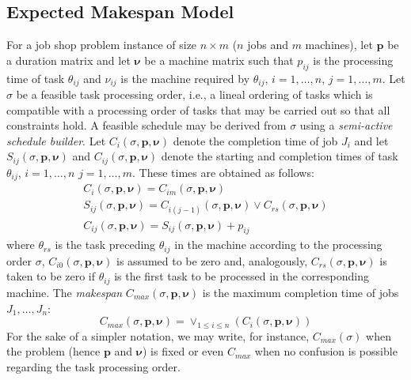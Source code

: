 \documentclass[letterpaper]{article}
\begin{document}
\subsection{Expected Makespan Model}\label{subsecExpectedMakespanProblem}
For a job shop problem instance of size $n \times m$ ($n$ jobs and $m$ machines), let $\boldsymbol{p}$ be a duration matrix and let $\boldsymbol{\nu}$ be a machine matrix such that $p_{ij}$ is the processing time of task $\theta_{ij}$ and $\nu_{ij}$ is the machine required by $\theta_{ij}$, $i=1,\dots,n$, $j=1,\dots,m$. Let $\sigma$ be a feasible task processing order, i.e., a lineal ordering of tasks which is compatible with a processing order of tasks that may be carried out so that all constraints hold. A feasible schedule may be derived from $\sigma$ using a \emph{semi-active schedule builder}. Let $C_i(\sigma,\boldsymbol{p},\boldsymbol{\nu})$ denote the completion time of job $J_i$ and let $S_{ij}(\sigma,\boldsymbol{p},\boldsymbol{\nu})$ and $C_{ij}(\sigma,\boldsymbol{p},\boldsymbol{\nu})$ denote the starting and completion times of task $\theta_{ij}$, $i=1,\dots,n$ $j=1,\dots,m$. These times are obtained as follows:
\begin{gather}
C_i(\sigma,\boldsymbol{p},\boldsymbol{\nu}) = C_{im}(\sigma,\boldsymbol{p},\boldsymbol{\nu})\\
S_{ij}(\sigma,\boldsymbol{p},\boldsymbol{\nu}) = C_{i(j-1)}(\sigma,\boldsymbol{p},\boldsymbol{\nu}) \vee
    C_{rs}(\sigma,\boldsymbol{p},\boldsymbol{\nu})\\
C_{ij}(\sigma,\boldsymbol{p},\boldsymbol{\nu}) = S_{ij}(\sigma,\boldsymbol{p},\boldsymbol{\nu}) + p_{ij}
\end{gather}
where $\theta_{rs}$ is the task preceding $\theta_{ij}$ in the machine according to the processing order $\sigma$, $C_{i0}(\sigma,\boldsymbol{p},\boldsymbol{\nu})$ is assumed to be zero and, analogously, $C_{rs}(\sigma,\boldsymbol{p},\boldsymbol{\nu})$ is taken to be zero if $\theta_{ij}$ is the first task to be processed in the corresponding machine. The \emph{makespan} $C_{max}(\sigma, \boldsymbol{p}, \boldsymbol{\nu})$ is the maximum completion time of jobs $J_1,\dots,J_n$:
\begin{equation}
C_{max}(\sigma, \boldsymbol{p}, \boldsymbol{\nu})= \vee_{1 \leq i \leq n}\left( C_i(\sigma,\boldsymbol{p},\boldsymbol{\nu}) \right)
\end{equation}
For the sake of a simpler notation, we may write, for instance, $C_{max}(\sigma)$ when the problem (hence $\boldsymbol{p}$ and $\boldsymbol{\nu}$) is fixed or even $C_{max}$ when no confusion is possible regarding the task processing order.
\end{document}

